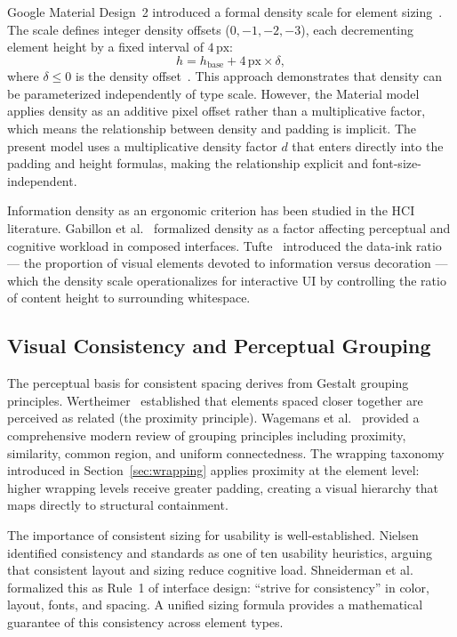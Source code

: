 Google Material Design~2 introduced a formal density scale for element sizing~\cite{materialdensity}. The scale defines integer density offsets ($0, -1, -2, -3$), each decrementing element height by a fixed interval of $4\,\text{px}$:
\[
h = h_{\text{base}} + 4\,\text{px} \times \delta,
\]
where $\delta \le 0$ is the density offset~\cite{kravets2020}. This approach demonstrates that density can be parameterized independently of type scale. However, the Material model applies density as an additive pixel offset rather than a multiplicative factor, which means the relationship between density and padding is implicit. The present model uses a multiplicative density factor $d$ that enters directly into the padding and height formulas, making the relationship explicit and font-size-independent.

Information density as an ergonomic criterion has been studied in the HCI literature. Gabillon et al.~\cite{gabillon2013} formalized density as a factor affecting perceptual and cognitive workload in composed interfaces. Tufte~\cite{tufte2001} introduced the data-ink ratio --- the proportion of visual elements devoted to information versus decoration --- which the density scale operationalizes for interactive UI by controlling the ratio of content height to surrounding whitespace.

\subsection{Visual Consistency and Perceptual Grouping}

The perceptual basis for consistent spacing derives from Gestalt grouping principles. Wertheimer~\cite{wertheimer1923} established that elements spaced closer together are perceived as related (the proximity principle). Wagemans et al.~\cite{wagemans2012} provided a comprehensive modern review of grouping principles including proximity, similarity, common region, and uniform connectedness. The wrapping taxonomy introduced in Section~\ref{sec:wrapping} applies proximity at the element level: higher wrapping levels receive greater padding, creating a visual hierarchy that maps directly to structural containment.

The importance of consistent sizing for usability is well-established. Nielsen~\cite{nielsen1994} identified consistency and standards as one of ten usability heuristics, arguing that consistent layout and sizing reduce cognitive load. Shneiderman et al.~\cite{shneiderman2016} formalized this as Rule~1 of interface design: ``strive for consistency'' in color, layout, fonts, and spacing. A unified sizing formula provides a mathematical guarantee of this consistency across element types.

